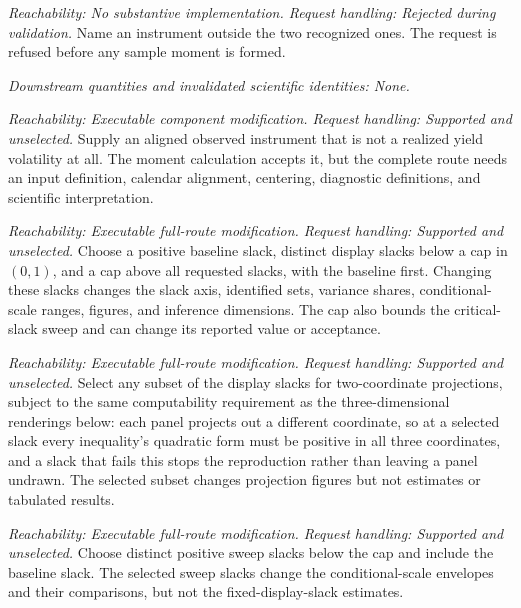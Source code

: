 \documentclass[11pt]{article}
\begin{document}
\begin{description}[style=nextline]
\item[Unrecognized instrument request.]
\emph{Reachability: No substantive implementation. Request handling: Rejected during validation.}
Name an instrument outside the two recognized ones. The request is refused before any sample moment
is formed.

\emph{Downstream quantities and invalidated scientific identities: None.}

\item[New observed instrument.]
\emph{Reachability: Executable component modification. Request handling: Supported and unselected.}
Supply an aligned observed instrument that is not a realized yield volatility at all. The moment
calculation accepts it, but the complete
route needs an input definition, calendar alignment, centering, diagnostic definitions, and scientific
interpretation.

\item[Baseline, display, and cap slacks.]
\emph{Reachability: Executable full-route modification. Request handling: Supported and unselected.}
Choose a positive baseline slack, distinct display slacks below a cap in \((0,1)\), and a cap above
all requested slacks, with the baseline first. Changing these slacks changes the slack axis, identified sets,
variance shares, conditional-scale ranges, figures, and inference dimensions. The cap also bounds
the critical-slack sweep and can change its reported value or acceptance.

\item[Two-coordinate projection slacks.]
\emph{Reachability: Executable full-route modification. Request handling: Supported and unselected.}
Select any subset of the display slacks for two-coordinate projections, subject to the same
computability requirement as the three-dimensional renderings below: each panel projects out a
different coordinate, so at a selected slack every inequality's quadratic form must be positive in
all three coordinates, and a slack that fails this stops the reproduction rather than leaving a panel
undrawn. The selected subset changes projection
figures but not estimates or tabulated results.

\item[Fitted-scale sweep slacks.]
\emph{Reachability: Executable full-route modification. Request handling: Supported and unselected.}
Choose distinct positive sweep slacks below the cap and include the baseline slack. The selected sweep slacks change the
conditional-scale envelopes and their comparisons, but not the fixed-display-slack estimates.


\end{description}
\end{document}
